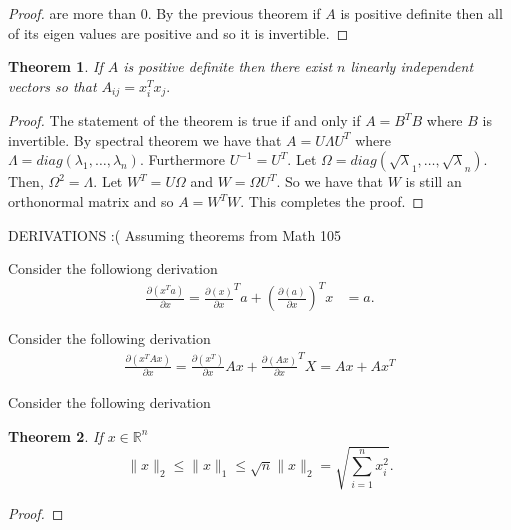 \documentclass[letter]{article}
\newtheorem{theorem}{Theorem}
\newenvironment{menumerate}{%
  \edef\backupindent{\the\parindent}%
  \enumerate%
  \setlength{\parindent}{\backupindent}%
}{\endenumerate}
\begin{document}
\begin{menumerate}
\begin{menumerate}
\begin{proof}
      are more than $0$. By the previous theorem if $A$ is positive definite then all of its eigen values
       are positive and so it is invertible.   
    \end{proof}
    \item
    \begin{theorem}
      If $A$ is positive definite then there exist $n$ linearly independent vectors so that 
      $A_{ij} = x^T_ix_j.$   
    \end{theorem}
    \begin{proof}
      The statement of the theorem is true if and only if $A = B^TB$ where $B$ is invertible. 
      By spectral theorem we have that $A = U\Lambda U^T$ where $\Lambda = diag(\lambda_1, \dots, \lambda_n).$
      Furthermore $U^{-1} = U^T$. Let $\Omega = diag(\sqrt \lambda_1, \dots, \sqrt \lambda_n).$ Then, 
      $\Omega^2 = \Lambda.$ Let $W^T = U\Omega$ and $W = \Omega U^T.$ So we have that $W$ is still an orthonormal matrix
      and so $A = W^TW.$ This completes the proof.
    \end{proof}
  \end{menumerate}
  \item DERIVATIONS :( Assuming theorems from Math 105
  \begin{menumerate}
      \item Consider the followiong derivation
      \begin{equation}
        \begin{aligned}
          \frac{\partial(x^Ta)}{\partial x} = \frac{\partial (x)}{\partial x}^T a + \left(\frac{\partial (a)}{\partial x}\right)^T x
          &= a.
        \end{aligned}
       \end{equation}
       \item Consider the following derivation
       \begin{equation}
          \begin{aligned}
              \frac{\partial(x^TAx)}{\partial x} = \frac{\partial(x^T)}{\partial x} Ax + \frac{\partial(Ax)}{\partial x}^TX = Ax + Ax^T
          \end{aligned}
       \end{equation}
       \item Consider the following derivation
       \item
       \begin{theorem}
          If $x \in \mathbb{R}^n$ 
          \begin{equation}
            \|x\|_2 \leq \|x\|_1 \leq \sqrt{n}\|x\|_2 = \sqrt{\sum_{i=1}^n x_i^2}.
          \end{equation}
       \end{theorem}
       \begin{proof}
            
       \end{proof}
  \end{menumerate}
\end{menumerate}
\end{document}
